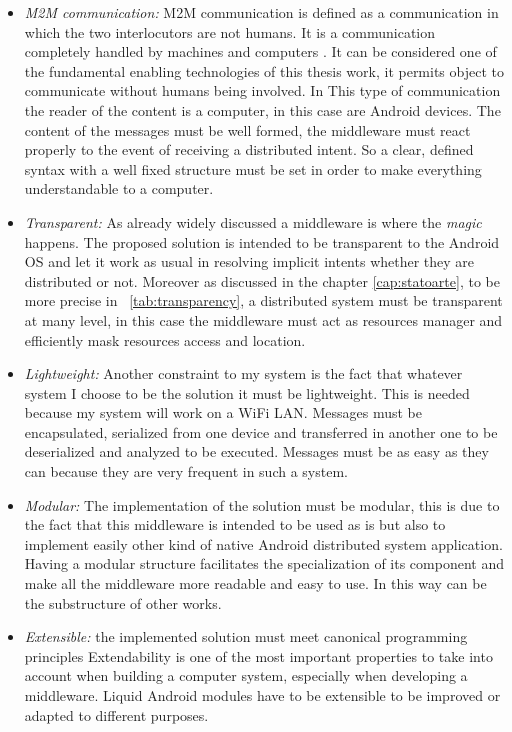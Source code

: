 \begin{itemize}
	\item \textit{M2M communication:} M2M communication is defined as a communication in which the two interlocutors are not humans. It is a communication completely handled by machines and computers \cite{cha2009trust}. It can be considered one of the fundamental enabling technologies of this thesis work, it permits object to communicate without humans being involved. In This type of communication the reader of the content is a computer, in this case are Android devices. The content of the messages must be well formed, the middleware must react properly to the event of receiving a distributed intent. So a clear, defined syntax with a well fixed structure  must be set in order to make everything understandable to a computer.
	
	\item \textit{Transparent:} As already widely discussed a middleware is where the \textit{magic} happens. The proposed solution is intended to be transparent to the Android OS and let it work as usual in resolving implicit intents whether they are distributed or not. Moreover as discussed in the chapter \ref{cap:statoarte}, to be more precise in \tablename~\ref{tab:transparency}, a distributed system must be transparent at many level, in this case the middleware must act as resources manager and efficiently mask resources access and location.
	
	
	\item \textit{Lightweight:} Another constraint to my system is the fact that whatever system I choose to be the solution it must be lightweight. This is needed because my system will work on a WiFi LAN. Messages must be encapsulated, serialized from one device and transferred in another one to be deserialized and analyzed to be executed. Messages must be as easy as they can because they are very frequent in such a system.
	
	\item \textit{Modular:} The implementation of the solution must be modular, this is due to the fact that this middleware is intended to be used as is but also to implement easily other kind of native Android distributed system application. Having a modular structure facilitates the specialization of its component and make all the middleware more readable and easy to use. In this way  can be the substructure of other works.
	
	\item \textit{Extensible:} the implemented solution must meet canonical programming principles Extendability is one of the most important properties to take into account when building a computer system, especially when developing a middleware. Liquid Android modules have to be extensible to be improved or adapted to different purposes.
		

\end{itemize}
